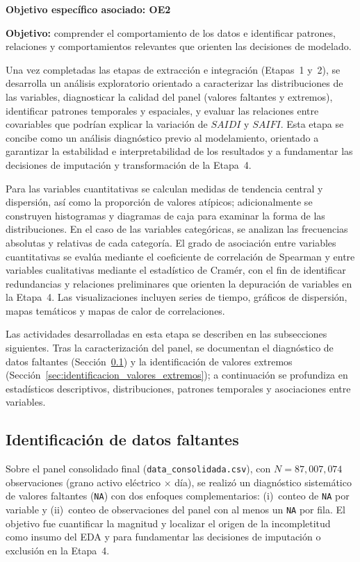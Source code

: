 \textbf{Objetivo específico asociado: OE2}

\textbf{Objetivo:} comprender el comportamiento de los datos e identificar patrones, relaciones y comportamientos relevantes que orienten las decisiones de modelado.

Una vez completadas las etapas de extracción e integración (Etapas~1 y~2), se desarrolla un análisis exploratorio orientado a caracterizar las distribuciones de las variables, diagnosticar la calidad del panel (valores faltantes y extremos), identificar patrones temporales y espaciales, y evaluar las relaciones entre covariables que podrían explicar la variación de $SAIDI$ y $SAIFI$. Esta etapa se concibe como un análisis diagnóstico previo al modelamiento, orientado a garantizar la estabilidad e interpretabilidad de los resultados y a fundamentar las decisiones de imputación y transformación de la Etapa~4.

Para las variables cuantitativas se calculan medidas de tendencia central y dispersión, así como la proporción de valores atípicos; adicionalmente se construyen histogramas y diagramas de caja para examinar la forma de las distribuciones. En el caso de las variables categóricas, se analizan las frecuencias absolutas y relativas de cada categoría. El grado de asociación entre variables cuantitativas se evalúa mediante el coeficiente de correlación de Spearman y entre variables cualitativas mediante el estadístico de Cramér, con el fin de identificar redundancias y relaciones preliminares que orienten la depuración de variables en la Etapa~4. Las visualizaciones incluyen series de tiempo, gráficos de dispersión, mapas temáticos y mapas de calor de correlaciones.


Las actividades desarrolladas en esta etapa se describen en las subsecciones siguientes. Tras la caracterización del panel, se documentan el diagnóstico de datos faltantes (Sección~\ref{sec:identificacion_datos_faltantes}) y la identificación de valores extremos (Sección~\ref{sec:identificacion_valores_extremos}); a continuación se profundiza en estadísticos descriptivos, distribuciones, patrones temporales y asociaciones entre variables.

\subsection{Identificación de datos faltantes}

\label{sec:identificacion_datos_faltantes}

Sobre el panel consolidado final (\texttt{data\_consolidada.csv}), con $N = 87{,}007{,}074$ observaciones (grano activo eléctrico $\times$ día), se realizó un diagnóstico sistemático de valores faltantes (\texttt{NA}) con dos enfoques complementarios: (i)~conteo de \texttt{NA} por variable y (ii)~conteo de observaciones del panel con al menos un \texttt{NA} por fila. El objetivo fue cuantificar la magnitud y localizar el origen de la incompletitud como insumo del EDA y para fundamentar las decisiones de imputación o exclusión en la Etapa~4.

